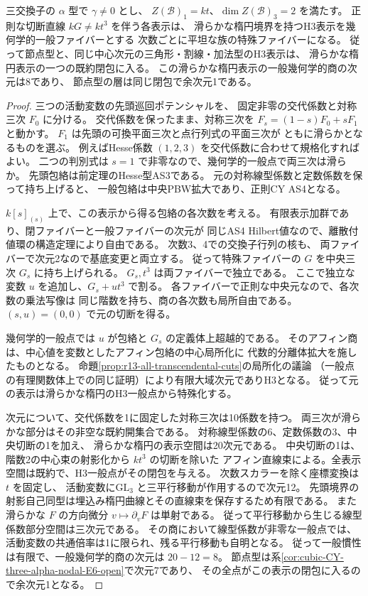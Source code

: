 \begin{theorem}[中央三次ペンシルを保つ境界特殊化]
\label{thm:cubic-CY-three-alpha-elliptic-boundary-closure}
三交換子の $\alpha$ 型で $\gamma\ne0$ とし、
$Z(\mathcal B)_1=kt$、$\dim Z(\mathcal B)_3=2$ を満たす。
正則な切断直線 $kG\ne kt^3$ を伴う各表示は、
滑らかな楕円境界を持つH3表示を幾何学的一般ファイバーとする
次数ごとに平坦な族の特殊ファイバーになる。
従って節点型と、同じ中心次元の三角形・割線・加法型のH3表示は、
滑らかな楕円表示の一つの既約閉包に入る。
この滑らかな楕円表示の一般幾何学的商の次元は8であり、
節点型の層は同じ閉包で余次元1である。
\end{theorem}
\begin{proof}
三つの活動変数の先頭巡回ポテンシャルを、
固定非零の交代係数と対称三次 $F_0$ に分ける。
交代係数を保ったまま、対称三次を
$F_s=(1-s)F_0+sF_1$ と動かす。
$F_1$ は先頭の可換平面三次と点行列式の平面三次が
ともに滑らかとなるものを選ぶ。
例えばHesse係数 $(1,2,3)$ を交代係数に合わせて規格化すればよい。
二つの判別式は $s=1$ で非零なので、幾何学的一般点で両三次は滑らか。
先頭包絡は前定理のHesse型AS3である。
元の対称線型係数と定数係数を保って持ち上げると、
一般包絡は中央PBW拡大であり、正則CY AS4となる。

$k[s]_{(s)}$ 上で、この表示から得る包絡の各次数を考える。
有限表示加群であり、閉ファイバーと一般ファイバーの次元が
同じAS4 Hilbert値なので、離散付値環の構造定理により自由である。
次数3、4での交換子行列の核も、
両ファイバーで次元2なので基底変更と両立する。
従って特殊ファイバーの $G$ を中央三次 $G_s$ に持ち上げられる。
$G_s,t^3$ は両ファイバーで独立である。
ここで独立な変数 $u$ を追加し、$G_s+ut^3$ で割る。
各ファイバーで正則な中央元なので、各次数の乗法写像は
同じ階数を持ち、商の各次数も局所自由である。
$(s,u)=(0,0)$ で元の切断を得る。

幾何学的一般点では $u$ が包絡と $G_s$ の定義体上超越的である。
そのアフィン商は、中心値を変数としたアフィン包絡の中心局所化に
代数的分離体拡大を施したものとなる。
命題\ref{prop:r13-all-transcendental-cuts}の局所化の議論
（一般点の有理関数体上での同じ証明）により有限大域次元でありH3となる。
従って元の表示は滑らかな楕円のH3一般点から特殊化する。

次元について、交代係数を1に固定した対称三次は10係数を持つ。
両三次が滑らかな部分はその非空な既約開集合である。
対称線型係数の6、定数係数の3、中央切断の1を加え、
滑らかな楕円の表示空間は20次元である。
中央切断の1は、階数2の中心束の射影化から $kt^3$ の切断を除いた
アフィン直線束による。全表示空間は既約で、H3一般点がその閉包を与える。
次数スカラーを除く座標変換は $t$ を固定し、
活動変数に$\mathrm{GL}_3$ と三平行移動が作用するので次元12。
先頭境界の射影自己同型は埋込み楕円曲線とその直線束を保存するため有限である。
また滑らかな $F$ の方向微分 $v\mapsto\partial_v F$ は単射である。
従って平行移動から生じる線型係数部分空間は三次元である。
その商において線型係数が非零な一般点では、
活動変数の共通倍率は1に限られ、残る平行移動も自明となる。
従って一般慣性は有限で、一般幾何学的商の次元は $20-12=8$。
節点型は系\ref{cor:cubic-CY-three-alpha-nodal-E6-open}で次元7であり、
その全点がこの表示の閉包に入るので余次元1となる。
\end{proof}

